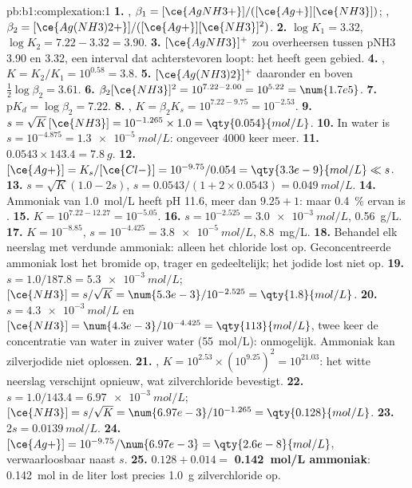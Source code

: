 \begin{solution}{pb:b1:complexation:1}
\textbf{1.} , $\beta_1 = [\ce{AgNH3+}]/([\ce{Ag+}][\ce{NH3}])$;
, $\beta_2 = [\ce{Ag(NH3)2+}]/([\ce{Ag+}][\ce{NH3}]^2)$.
\textbf{2.} $\log K_1 = 3.32$, $\log K_2 = 7.22 - 3.32 = 3.90$.
\textbf{3.} $[\ce{AgNH3}]^{+}$ zou overheersen tussen pNH3 3.90 en 3.32,
een interval dat achterstevoren loopt: het heeft geen gebied.
\textbf{4.} , $K = K_2/K_1 = 10^{0.58} =
3.8$.
\textbf{5.} $[\ce{Ag(NH3)2}]^{+}$ daaronder en  boven
$\frac12\log\beta_2 = 3.61$.
\textbf{6.} $\beta_2[\ce{NH3}]^2 = 10^{7.22 - 2.00} = 10^{5.22} = \num{1.7e5}$.
\textbf{7.} $\mathrm{p}K_d = \log\beta_2 = 7.22$.
\textbf{8.} , $K = \beta_2K_s =
10^{7.22 - 9.75} = 10^{-2.53}$.
\textbf{9.} $s = \sqrt{K}\,[\ce{NH3}] = 10^{-1.265} \times 1.0 =
\qty{0.054}{mol/L}$.
\textbf{10.} In water is $s = 10^{-4.875} = \qty{1.3e-5}{mol/L}$: ongeveer
4000 keer meer.
\textbf{11.} $0.0543 \times 143.4 = \qty{7.8}{g}$.
\textbf{12.} $[\ce{Ag+}] = K_s/[\ce{Cl-}] = 10^{-9.75}/0.054 =
\qty{3.3e-9}{mol/L} \ll s$.
\textbf{13.} $s = \sqrt{K}(1.0 - 2s)$, $s = 0.0543/(1 + 2 \times 0.0543) =
\qty{0.049}{mol/L}$.
\textbf{14.} Ammoniak van \qty{1.0}{mol/L} heeft pH 11.6, meer dan
$9.25 + 1$: maar \qty{0.4}{\percent} ervan is .
\textbf{15.} $K = 10^{7.22 - 12.27} = 10^{-5.05}$.
\textbf{16.} $s = 10^{-2.525} = \qty{3.0e-3}{mol/L}$, \qty{0.56}{g/L}.
\textbf{17.} $K = 10^{-8.85}$, $s = 10^{-4.425} = \qty{3.8e-5}{mol/L}$,
\qty{8.8}{mg/L}.
\textbf{18.} Behandel elk neerslag met verdunde ammoniak: alleen het
chloride lost op. Geconcentreerde ammoniak lost het bromide op, trager en
gedeeltelijk; het jodide lost niet op.
\textbf{19.} $s = 1.0/187.8 = \qty{5.3e-3}{mol/L}$; $[\ce{NH3}] = s/\sqrt{K}
= \num{5.3e-3}/10^{-2.525} = \qty{1.8}{mol/L}$.
\textbf{20.} $s = \qty{4.3e-3}{mol/L}$ en $[\ce{NH3}] = \num{4.3e-3}/10^{-4.425}
= \qty{113}{mol/L}$, twee keer de concentratie van water in zuiver water
(\qty{55}{mol/L}): onmogelijk. Ammoniak kan zilverjodide niet oplossen.
\textbf{21.} ,
$K = 10^{2.53} \times (10^{9.25})^2 = 10^{21.03}$: het witte neerslag
verschijnt opnieuw, wat zilverchloride bevestigt.
\textbf{22.} $s = 1.0/143.4 = \qty{6.97e-3}{mol/L}$; $[\ce{NH3}] =
s/\sqrt{K} = \num{6.97e-3}/10^{-1.265} = \qty{0.128}{mol/L}$.
\textbf{23.} $2s = \qty{0.0139}{mol/L}$.
\textbf{24.} $[\ce{Ag+}] = 10^{-9.75}/\num{6.97e-3} = \qty{2.6e-8}{mol/L}$,
verwaarloosbaar naast $s$.
\textbf{25.} $0.128 + 0.014 = $ \textbf{\qty{0.142}{mol/L} ammoniak}:
\qty{0.142}{mol} in de liter lost precies \qty{1.0}{g} zilverchloride
op.
\end{solution}
